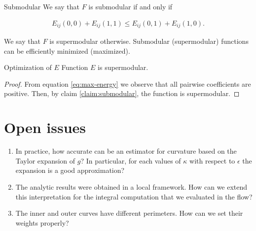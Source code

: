 \begin{claim}{Submodular} \label{claim:submodular}
 We say that $F$ is submodular if and only if 
 
 \begin{align*}
	E_{ij}(0,0) + E_{ij}(1,1) \leq E_{ij}(0,1) + E_{ij}(1,0).
 \end{align*}
\end{claim}

We say that $F$ is supermodular otherwise. Submodular (supermodular) functions can be efficiently minimized (maximized).

%
%

\begin{claim}{Optimization of $E$}
	Function $E$ is supermodular.
\end{claim}

\begin{proof}
	From equation \eqref{eq:max-energy} we observe that all pairwise coefficients are positive. Then, by claim \ref{claim:submodular}, the function is supermodular.
\end{proof}


\section{Open issues}

\begin{enumerate}
	\item{In practice, how accurate can be an estimator for curvature based on the Taylor expansion of $g$? In particular, for each values of $\kappa$ with respect to $\epsilon$ the expansion is a good approximation?}
	\item{The analytic results were obtained in a local framework. How can we extend this interpretation for the integral computation that we evaluated in the flow?}
	\item{The inner and outer curves have different perimeters. How can we set their weights properly?}
\end{enumerate}
